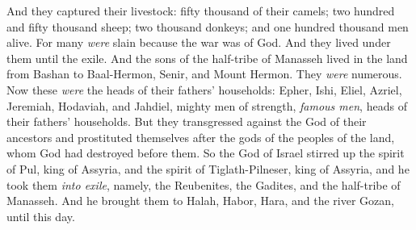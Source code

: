 \begin{biblechapter}
\verse And they captured their livestock: fifty thousand of their camels; two hundred and fifty thousand sheep; two thousand donkeys; and one hundred thousand men alive.
\verse For many \textit{were} slain because the war was of God. And they lived under them until the exile.
 And the sons of the half-tribe of Manasseh lived in the land from Bashan to Baal-Hermon, Senir, and Mount Hermon. They \textit{were} numerous.
\verse Now these \textit{were} the heads of their fathers’ households: Epher, Ishi, Eliel, Azriel, Jeremiah, Hodaviah, and Jahdiel, mighty men of strength, \textit{famous men}, heads of their fathers’ households.
\verse But they transgressed against the God of their ancestors and prostituted themselves after the gods of the peoples of the land, whom God had destroyed before them.
\verse So the God of Israel stirred up the spirit of Pul, king of Assyria, and the spirit of Tiglath-Pilneser, king of Assyria, and he took them \textit{into exile}, namely, the Reubenites, the Gadites, and the half-tribe of Manasseh. And he brought them to Halah, Habor, Hara, and the river Gozan, until this day.
\end{biblechapter}

